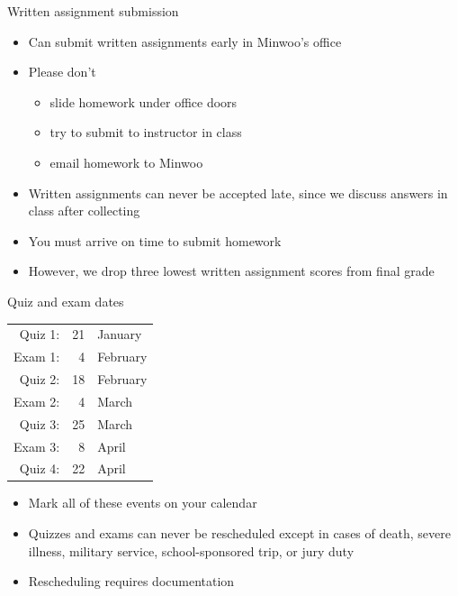 \documentclass[xcolor=dvipsnames]{beamer}
\theoremstyle{definition}
\begin{document}
\begin{frame}{Written assignment submission}
\begin{itemize}
\item Can submit written assignments early in Minwoo's office
\item Please don't
\begin{itemize}
\item slide homework under office doors
\item try to submit to instructor in class
\item email homework to Minwoo
\end{itemize}
\item Written assignments can \alert{never} be accepted late,
since we discuss answers in class after collecting
\item You must arrive on time to submit homework
\item However, we drop three lowest written assignment scores from final grade
\end{itemize}
\end{frame}

\begin{frame}{Quiz and exam dates}
\begin{center}\begin{tabular}{rrl}
Quiz 1:&21&January\\
Exam 1:&4&February\\
Quiz 2:&18&February\\
Exam 2:&4&March\\
Quiz 3:&25&March\\
Exam 3:&8&April\\
Quiz 4:&22&April
\end{tabular}\end{center}
\begin{itemize}
\item Mark all of these events on your calendar
\item Quizzes and exams can \alert{never} be rescheduled
except in cases of death, severe illness, military service,
school-sponsored trip, or jury duty
\item Rescheduling requires documentation
\end{itemize}
\end{frame}
\end{document}
